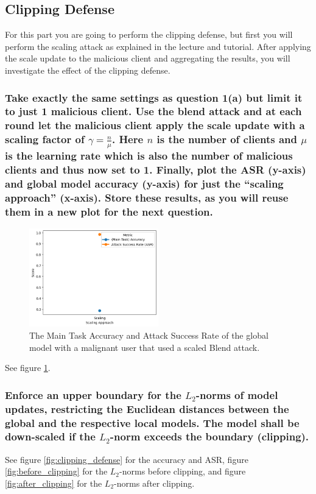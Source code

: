 \documentclass{article}
\begin{document}
\subsection{Clipping Defense}
For this part you are going to perform the clipping defense, but first you will perform
the scaling attack as explained in the lecture and tutorial. After applying the scale
update to the malicious client and aggregating the results, you will investigate the
effect of the clipping defense.

\subsubsection{Take exactly the same settings as question 1(a) but limit it to just 1
malicious client. Use the blend attack and at each round let the malicious client
apply the scale update with a scaling factor of $\gamma = \frac{n}{\mu}$. Here $n$ is the number of
clients and $\mu$ is the learning rate which is also the number of malicious clients
and thus now set to 1. Finally, plot the ASR (y-axis) and global model accuracy
(y-axis) for just the “scaling approach” (x-axis). Store these results, as you will
reuse them in a new plot for the next question.}
\begin{figure}
    \centering
    \includegraphics[width=0.5\textwidth]{scaling_attack.png}
    \caption{The Main Task Accuracy and Attack Success Rate of the global model with a malignant user that used a scaled Blend attack.}
    \label{fig:scaling_attack}
\end{figure}

See figure \ref{fig:scaling_attack}.

\subsubsection{Enforce an upper boundary for the $L_2$-norms of model updates, restricting the Euclidean distances between the global and the respective local
models. The model shall be down-scaled if the $L_2$-norm exceeds the boundary (clipping).}
See figure \ref{fig:clipping_defense} for the accuracy and ASR, figure \ref{fig:before_clipping} for the $L_2$-norms before clipping, and figure \ref{fig:after_clipping} for the $L_2$-norms after clipping.
\end{document}
